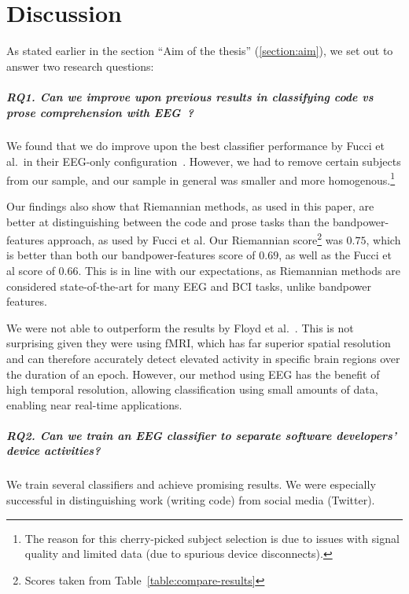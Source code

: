 \chapter{Discussion}\label{section:discussion}

As stated earlier in the section ``Aim of the thesis'' (\ref{section:aim}), we set out to answer two research questions:

\paragraph*{RQ1. Can we improve upon previous results in classifying code vs prose comprehension with EEG~?}

We found that we do improve upon the best classifier performance by Fucci et al.\ in their EEG-only configuration~\cite{fucci_replication_2019}. However, we had to remove certain subjects from our sample, and our sample in general was smaller and more homogenous.\footnote{The reason for this cherry-picked subject selection is due to issues with signal quality and limited data (due to spurious device disconnects).}

Our findings also show that Riemannian methods, as used in this paper, are better at distinguishing between the code and prose tasks than the bandpower-features approach, as used by Fucci et al. Our Riemannian score\footnote{Scores taken from Table~\ref{table:compare-results}} was $0.75$, which is better than both our bandpower-features score of $0.69$, as well as the Fucci et al score of $0.66$. This is in line with our expectations, as Riemannian methods are considered state-of-the-art for many EEG and BCI tasks, unlike bandpower features.

We were not able to outperform the results by Floyd et al.~\cite{floyd_decoding_2017}. This is not surprising given they were using fMRI, which has far superior spatial resolution and can therefore accurately detect elevated activity in specific brain regions over the duration of an epoch. However, our method using EEG has the benefit of high temporal resolution, allowing classification using small amounts of data, enabling near real-time applications.

\paragraph*{RQ2. Can we train an EEG classifier to separate software developers’ device activities?}

We train several classifiers and achieve promising results. We were especially successful in distinguishing work (writing code) from social media (Twitter).

